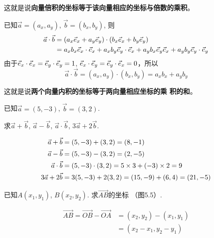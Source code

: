 这就是说\textbf{向量倍积的坐标等于该向量相应的坐标与倍数的乘积}。

已知$\vec{a}=(a_x,a_y)$, $\vec{b}=(b_x,b_y)$, 则
\[\begin{split}
    \vec{a}\cdot \vec{b}&=(a_x\vec{e}_x+a_y\vec{e}_y)\cdot (b_x\vec{e}_x+b_y\vec{e}_y)\\
    &=a_xb_x\vec{e}_x\cdot \vec{e}_x+a_xb_y\vec{e}_y\cdot \vec{e}_x+a_yb_x\vec{e}_y\vec{e}_x+a_yb_y\vec{e}_y\cdot \vec{e}_y
\end{split}\]
由于$\vec{e}_x\cdot \vec{e}_x=\vec{e}_y\cdot \vec{e}_y=1$, $\vec{e}_x\cdot \vec{e}_y=\vec{e}_y\cdot \vec{e}_x=0$，所以
\[\vec{a}\cdot \vec{b}=(a_x,a_y)\cdot (b_x,b_y)=a_xb_x+a_yb_y\]

这就是说\textbf{两个向量内积的坐标等于两向量相应坐标的乘
积的和}。

\begin{example}
    已知$\vec{a}=(5,-3)$, $\vec{b}=(3,2)$.

求$\vec{a}+\vec{b}$, $\vec{a}-\vec{b}$, $\vec{a}\cdot \vec{b}$, $3\vec{a}+2\vec{b}$.
\end{example}

\begin{solution}
\[\begin{split}
    \vec{a}+\vec{b}&=(5,-3)+(3,2)=(8,-1)\\
    \vec{a}-\vec{b}&=(5,-3)-(3,2)=(2,-5)\\
    \vec{a}\cdot \vec{b}&=(5,-3)\cdot (3,2)=5\times 3+(-3)\times2=9\\
    3\vec{a}+2\vec{b}&=3(5,-3)+2(3,2)=(15,-9)+(6,4)=(21,-5)
\end{split}\]
\end{solution}

\begin{example}
    已知$A(x_1,y_1)$, $B(x_2,y_2)$. 求$\Vec{AB}$的坐标
（图5.5）.
\end{example}

\begin{figure}[htp]
    \centering
{}
    \caption{}
\end{figure}


\begin{solution}
\[\begin{split}
    \Vec{AB}=\Vec{OB}-\Vec{OA}&=(x_2,y_2)-(x_1,y_1)\\
    &=(x_2-x_1,y_2-y_1)
\end{split}\]
\end{solution}

